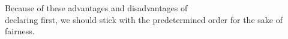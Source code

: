 \bigskip
Because of these advantages and disadvantages of \\declaring first, we should stick with the predetermined order for the sake of fairness. 

\newpage

